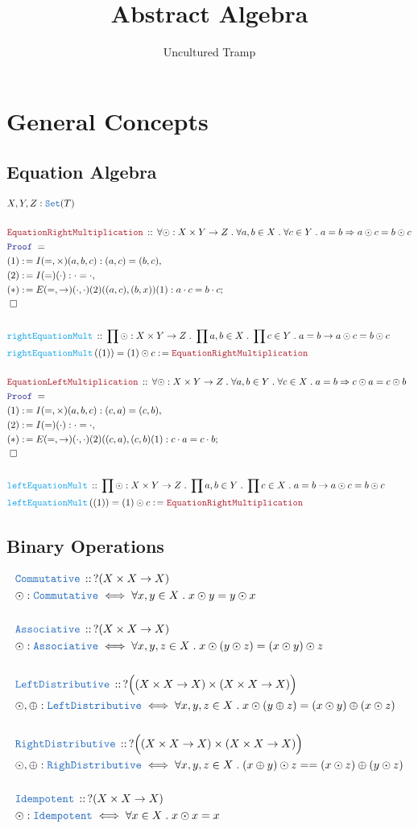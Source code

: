 \documentclass[12pt]{scrartcl}
\author{Uncultured Tramp}
\title{Abstract Algebra}
\newcommand{\TYPE}[1]{\textcolor{NavyBlue}{\mathtt{#1}}}
\newcommand{\FUNC}[1]{\textcolor{Cerulean}{\mathtt{#1}}}
\newcommand{\LOGIC}[1]{\textcolor{Blue}{\mathtt{#1}}}
\newcommand{\THM}[1]{\textcolor{Maroon}{\mathtt{#1}}}
\renewcommand{\.}{\; . \;}
\newcommand{\de}{: \kern 0.1pc =}
\newcommand{\Act}[1]{\left( #1 \right)}
\newcommand{\Theorem}[2]{& \THM{#1} \, :: \, #2 \\ & \Proof = \\ }
\newcommand{\DeclareType}[2]{& \TYPE{#1} \, :: \, #2 \\}
\newcommand{\DefineType}[3]{& #1 : \TYPE{#2} \iff #3 \\}
\newcommand{\DeclareFunc}[2]{& \FUNC{#1} \, :: \, #2 \\}
\newcommand{\DefineNamedFunc}[4]{&  \FUNC{#1}\Act{#2} = #3 \de #4 \\}
\newcommand{\Page}[1]{ \begin{align*} #1 \end{align*}   }
\newcommand{\Say}[3]{& #1 \de #2 : #3, \\}
\newcommand{\Conclude}[3]{& #1 \de #2 : #3; \\}
\newcommand{\QED}{\; \square}
\newcommand{\EndProof}{& \QED \\}
\newcommand{\Proof}{\LOGIC{Proof} \; }
\begin{document}
\maketitle
\newpage
\tableofcontents
\newpage
\section{General Concepts}
\subsection{Equation Algebra}
\Page{
	&  X,Y,Z : \TYPE{Set}(T)    \\
	\\
	\Theorem{EquationRightMultiplication}{\forall \odot :  X \times Y \to Z \. \forall a,b \in X \. \forall c \in Y \. 
	a = b \Rightarrow a \odot c = b \odot c 
	}
	\Say{ (1)  }{  I(=,\times)(a,b,c)   }{(a,c) = (b,c)}
	\Say{ (2)  }{  I(=)(\cdot)}{ \cdot = \cdot}
	\Conclude{ (*)  }{   E(=,\to)(\cdot,\cdot)(2)((a,c),(b,x))(1)  }{  a \cdot c = b \cdot c   }
	\EndProof
	\\
	\DeclareFunc{rightEquationMult}{\prod \odot : X \times Y \to Z \. \prod a, b \in X \.
		\prod c \in Y \. a = b \to a \odot c = b \odot c
	}
	\DefineNamedFunc{rightEquationMult}{(1)}{(1) \odot c }{ \THM{EquationRightMultiplication} }
	\\
	\Theorem{EquationLeftMultiplication}{\forall \odot :  X \times Y \to Z \. \forall a,b \in Y \. \forall c \in X \. 
	a = b \Rightarrow c \odot a = c \odot b 
	}
	\Say{ (1)  }{  I(=,\times)(a,b,c)   }{(c,a) = (c,b)}
	\Say{ (2)  }{  I(=)(\cdot)}{ \cdot = \cdot}
	\Conclude{ (*)  }{   E(=,\to)(\cdot,\cdot)(2)((c,a),(c,b)(1)  }{  c \cdot a = c \cdot b   }
	\EndProof
	\\
	\DeclareFunc{leftEquationMult}{\prod \odot : X \times Y \to Z \. \prod a, b \in Y \.
		\prod c \in X \. a = b \to a \odot c = b \odot c
	}
	\DefineNamedFunc{leftEquationMult}{(1)}{(1) \odot c }{ \THM{EquationRightMultiplication} }
}
\newpage
\subsection{Binary Operations}
\Page{
	\DeclareType{Commutative}{ ?(X \times X \to X)}
	\DefineType{ \odot }{Commutative}{ \forall x,y \in X \. x \odot y = y \odot x    }
	\\
	\DeclareType{Associative}{?(X \times X \to X)}
	\DefineType{\odot}{Associative}{\forall x,y,z \in X \. x \odot (y \odot z) = (x \odot y) \odot z}
	\\
	\DeclareType{LeftDistributive}{?\Big((X \times X \to X) \times (X \times X \to X)\Big) }
	\DefineType{\odot,\oplus}{LeftDistributive}{  \forall x,y,z \in X \. x \odot (y \oplus z) = 
		(x \odot y) \oplus ( x \odot z)  }
	\\
	\DeclareType{RightDistributive}{?\Big((X \times X \to X) \times (X \times X \to X)\Big)}
	\DefineType{\odot,\oplus}{RighDistributive}{\forall x,y,z \in X \. (x \oplus y) \odot z =
		= (x \odot z) \oplus (y \odot z) 
	}
	\\
	\DeclareType{Idempotent}{?(X \times X \to X)}
	\DefineType{\odot}{Idempotent}{\forall x \in X \. x \odot x = x}
}
\newpage
\end{document}
